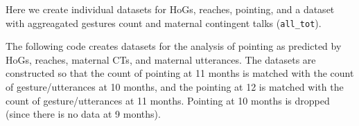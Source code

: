 \documentclass[]{article}
\newenvironment{Shaded}{\begin{snugshade}}{\end{snugshade}}
\newcommand{\CommentTok}[1]{\textcolor[rgb]{0.56,0.35,0.01}{\textit{#1}}}
\newcommand{\DataTypeTok}[1]{\textcolor[rgb]{0.13,0.29,0.53}{#1}}
\newcommand{\KeywordTok}[1]{\textcolor[rgb]{0.13,0.29,0.53}{\textbf{#1}}}
\newcommand{\NormalTok}[1]{#1}
\newcommand{\OperatorTok}[1]{\textcolor[rgb]{0.81,0.36,0.00}{\textbf{#1}}}
\newcommand{\StringTok}[1]{\textcolor[rgb]{0.31,0.60,0.02}{#1}}
\begin{document}
Here we create individual datasets for HoGs, reaches, pointing, and a
dataset with aggreagated gestures count and maternal contingent talks
(\texttt{all\_tot}).

\begin{Shaded}
\end{Shaded}

The following code creates datasets for the analysis of pointing as
predicted by HoGs, reaches, maternal CTs, and maternal utterances. The
datasets are constructed so that the count of pointing at 11 months is
matched with the count of gesture/utterances at 10 months, and the
pointing at 12 is matched with the count of gesture/utterances at 11
months. Pointing at 10 months is dropped (since there is no data at 9
months).
\end{document}
